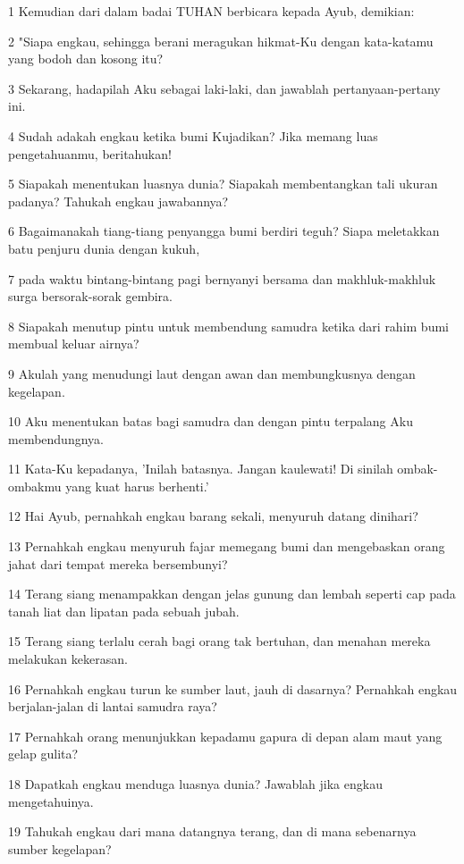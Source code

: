 \par 1 Kemudian dari dalam badai TUHAN berbicara kepada Ayub, demikian:
\par 2 "Siapa engkau, sehingga berani meragukan hikmat-Ku dengan kata-katamu yang bodoh dan kosong itu?
\par 3 Sekarang, hadapilah Aku sebagai laki-laki, dan jawablah pertanyaan-pertany ini.
\par 4 Sudah adakah engkau ketika bumi Kujadikan? Jika memang luas pengetahuanmu, beritahukan!
\par 5 Siapakah menentukan luasnya dunia? Siapakah membentangkan tali ukuran padanya? Tahukah engkau jawabannya?
\par 6 Bagaimanakah tiang-tiang penyangga bumi berdiri teguh? Siapa meletakkan batu penjuru dunia dengan kukuh,
\par 7 pada waktu bintang-bintang pagi bernyanyi bersama dan makhluk-makhluk surga bersorak-sorak gembira.
\par 8 Siapakah menutup pintu untuk membendung samudra ketika dari rahim bumi membual keluar airnya?
\par 9 Akulah yang menudungi laut dengan awan dan membungkusnya dengan kegelapan.
\par 10 Aku menentukan batas bagi samudra dan dengan pintu terpalang Aku membendungnya.
\par 11 Kata-Ku kepadanya, 'Inilah batasnya. Jangan kaulewati! Di sinilah ombak-ombakmu yang kuat harus berhenti.'
\par 12 Hai Ayub, pernahkah engkau barang sekali, menyuruh datang dinihari?
\par 13 Pernahkah engkau menyuruh fajar memegang bumi dan mengebaskan orang jahat dari tempat mereka bersembunyi?
\par 14 Terang siang menampakkan dengan jelas gunung dan lembah seperti cap pada tanah liat dan lipatan pada sebuah jubah.
\par 15 Terang siang terlalu cerah bagi orang tak bertuhan, dan menahan mereka melakukan kekerasan.
\par 16 Pernahkah engkau turun ke sumber laut, jauh di dasarnya? Pernahkah engkau berjalan-jalan di lantai samudra raya?
\par 17 Pernahkah orang menunjukkan kepadamu gapura di depan alam maut yang gelap gulita?
\par 18 Dapatkah engkau menduga luasnya dunia? Jawablah jika engkau mengetahuinya.
\par 19 Tahukah engkau dari mana datangnya terang, dan di mana sebenarnya sumber kegelapan?
